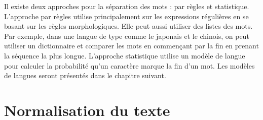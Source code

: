 \documentclass{KodeBook}
\begin{document}
Il existe deux approches pour la séparation des mots : par règles et statistique. 
L'approche par règles utilise principalement sur les expressions régulières en se basant sur les règles morphologiques.
Elle peut aussi utiliser des listes des mots. 
Par exemple, dans une langue de type  comme le japonais et le chinois, on peut utiliser un dictionnaire et comparer les mots en commençant par la fin en prenant la séquence la plus longue.
L'approche statistique utilise un modèle de langue pour calculer la probabilité qu'un caractère marque la fin d'un mot. 
Les modèles de langues seront présentés dans le chapitre suivant. 


\section{Normalisation du texte}
\end{document}
